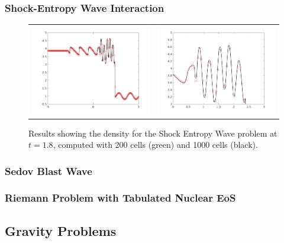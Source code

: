 \documentclass[10pt,preprint]{aastex}
\begin{document}
\clearpage
\subsubsection{Shock-Entropy Wave Interaction}

\begin{figure}[h]
  \begin{center}
	\begin{tabular}{cc}
      \includegraphics[width=.475\textwidth]{den.png} &
	  \includegraphics[width=.475\textwidth]{denzoom.png}
	\end{tabular}
  \end{center}
  \caption{Results showing the density for the Shock Entropy Wave problem at $t=1.8$, computed with 200 cells (green) and 1000 cells (black).}
  \label{fig:shock}
\end{figure}

\subsubsection{Sedov Blast Wave}

\subsubsection{Riemann Problem with Tabulated Nuclear EoS}

\subsection{Gravity Problems}
\end{document}
